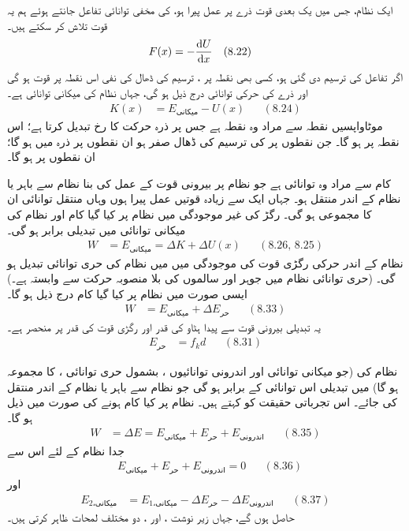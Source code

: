 ایک نظام،  جس میں یک بعدی  قوت   ذرے پر  عمل پیرا ہو، کی مخفی توانائی تفاعل  جانتے ہوئے ہم یہ قوت تلاش کر سکتے ہیں۔
\begin{align*}
F(x)&=-\frac{\dif U}{\dif x}&&(8.22)
\end{align*}
اگر تفاعل   کی ترسیم دی گئی ہو، کسی بھی  نقطہ  پر ، ترسیم کی  ڈھال  کی   نفی  اس نقطہ پر  قوت  ہو گی اور  ذرے کی حرکی توانائی درج ذیل ہو گی،  جہاں  نظام  کی میکانی توانائی ہے۔
\begin{align*}
K(x)&=E_{\text{میکانی}}-U(x)&&(8.24)
\end{align*}
موٹا{واپسیں نقطہ } سے مراد وہ نقطہ ہے جس پر ذرہ  حرکت کا رخ تبدیل کرتا ہے؛ اس نقطہ پر  ہو گا۔ جن نقطوں پر  کی ترسیم  کی ڈھال صفر ہو ان نقطوں پر ذرہ میں ہو گا؛ ان نقطوں پر  ہو گا۔

کام  سے مراد وہ توانائی ہے  جو نظام پر بیرونی قوت کے عمل   کی بنا نظام سے  باہر  یا نظام کے اندر منتقل ہو۔ جہاں ایک سے زیادہ قوتیں عمل پیرا ہوں وہاں منتقل توانائی   ان کا مجموعی ہو گی۔   رگڑ کی غیر موجودگی میں  نظام پر کیا گیا کام اور نظام کی میکانی توانائی میں تبدیلی  برابر ہو گی۔
\begin{align*}
W&=E_{\text{میکانی}}=\Delta K+\Delta U(x)&&(8.26,\, 8.25)
\end{align*}
نظام کے اندر حرکی رگڑی قوت کی موجودگی میں میں نظام کی حری توانائی  تبدیل ہو گی۔ (حری توانائی نظام میں  جوہر  اور سالموں  کی بلا منصوبہ حرکت سے وابستہ ہے۔) ایسی صورت میں نظام پر کیا گیا کام درج ذیل ہو گا۔
\begin{align*}
W&=E_{\text{میکانی}}+\Delta E_{\text{حر}}&&(8.33)
\end{align*}
یہ تبدیلی  بیرونی قوت  سے پیدا  ہٹاو کی قدر   اور  رگڑی قوت کی قدر   پر منحصر ہے۔
\begin{align*}
E_{\text{حر}}&=f_k d&&(8.31)
\end{align*}

نظام کی (جو میکانی توانائی اور  اندرونی توانائیوں    ، بشمول حری توانائی  ، کا مجموعہ ہو گا) میں تبدیلی  اس  توانائی  کے برابر ہو گی جو نظام سے باہر یا نظام کے اندر منتقل کی جائے۔ اس تجرباتی حقیقت کو کہتے ہیں۔ نظام پر کیا کام  ہونے کی صورت میں  ذیل ہو گا۔
\begin{align*}
W&=\Delta E=E_{\text{میکانی}}+E_{\text{حر}}+E_{\text{اندرونی}}&&(8.35)
\end{align*}
جدا  نظام  کے لئے اس سے 
\begin{align*}
&E_{\text{میکانی}}+E_{\text{حر}}+E_{\text{اندرونی}} = 0 
&&(8.36)
\end{align*}
اور
\begin{align*}
E_{\text{میکانی،2}}&=E_{\text{میکانی،1}}-\Delta E_{\text{حر}}-\Delta E_{\text{اندرونی}} &&(8.37)
\end{align*}
حاصل ہوں گے، جہاں زیر نوشت ،  اور  ، دو مختلف لمحات ظاہر کرتی ہیں۔


